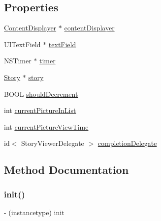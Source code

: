 \subsection*{Properties}
\begin{DoxyCompactItemize}
\item 
\hyperlink{interface_content_displayer}{Content\+Displayer} $\ast$ \hyperlink{interface_story_snap_view_controller_a1c5dae46de695864b887191fe61187c2}{content\+Displayer}
\item 
U\+I\+Text\+Field $\ast$ \hyperlink{interface_story_snap_view_controller_ab62e3985da2d4f7f337a912bf235a75c}{text\+Field}
\item 
N\+S\+Timer $\ast$ \hyperlink{interface_story_snap_view_controller_a57a20333a472a80cb8c02887b5f8f243}{timer}
\item 
\hyperlink{interface_story}{Story} $\ast$ \hyperlink{interface_story_snap_view_controller_a3be8c054b1ebd79ba1462b0057a5aeb4}{story}
\item 
B\+O\+OL \hyperlink{interface_story_snap_view_controller_a54242d1a6ce39379b1adf54866e5fdea}{should\+Decrement}
\item 
int \hyperlink{interface_story_snap_view_controller_a24797951ede1ab1ca41c510bb4ead648}{current\+Picture\+In\+List}
\item 
int \hyperlink{interface_story_snap_view_controller_a20b070ba519dc314663e6518858f0ac4}{current\+Picture\+View\+Time}
\item 
id$<$ Story\+Viewer\+Delegate $>$ \hyperlink{interface_story_snap_view_controller_a8364d923054951348b8071a6773649c3}{completion\+Delegate}
\end{DoxyCompactItemize}


\subsection{Method Documentation}
\hypertarget{interface_story_snap_view_controller_a2a833b5127655faabdcd388e295bbeeb}{}\label{interface_story_snap_view_controller_a2a833b5127655faabdcd388e295bbeeb} 
\subsubsection{\texorpdfstring{init()}{init()}}
{\footnotesize\ttfamily -\/ (instancetype) init \begin{DoxyParamCaption}{ }\end{DoxyParamCaption}}


